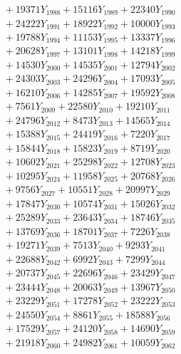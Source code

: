 \documentclass[a4paper,10pt]{article}
\begin{document}
{\begin{align}
&\;  + 19371 Y_{1988} + 15116 Y_{1989} + 22340 Y_{1990} \\[0.3ex]
&\;  + 24222 Y_{1991} + 18922 Y_{1992} + 10000 Y_{1993} \\[0.3ex]
&\;  + 19788 Y_{1994} + 11153 Y_{1995} + 13337 Y_{1996} \\[0.3ex]
&\;  + 20628 Y_{1997} + 13101 Y_{1998} + 14218 Y_{1999} \\[0.3ex]
&\;  + 14530 Y_{2000} + 14535 Y_{2001} + 12794 Y_{2002} \\[0.3ex]
&\;  + 24303 Y_{2003} + 24296 Y_{2004} + 17093 Y_{2005} \\[0.3ex]
&\;  + 16210 Y_{2006} + 14285 Y_{2007} + 19592 Y_{2008} \\[0.5ex]\allowbreak
&\;  + 7561 Y_{2009} + 22580 Y_{2010} + 19210 Y_{2011} \\[0.3ex]
&\;  + 24796 Y_{2012} + 8473 Y_{2013} + 14565 Y_{2014} \\[0.3ex]
&\;  + 15388 Y_{2015} + 24419 Y_{2016} + 7220 Y_{2017} \\[0.3ex]
&\;  + 15844 Y_{2018} + 15823 Y_{2019} + 8719 Y_{2020} \\[0.3ex]
&\;  + 10602 Y_{2021} + 25298 Y_{2022} + 12708 Y_{2023} \\[0.3ex]
&\;  + 10295 Y_{2024} + 11958 Y_{2025} + 20768 Y_{2026} \\[0.3ex]
&\;  + 9756 Y_{2027} + 10551 Y_{2028} + 20997 Y_{2029} \\[0.3ex]
&\;  + 17847 Y_{2030} + 10574 Y_{2031} + 15026 Y_{2032} \\[0.3ex]
&\;  + 25289 Y_{2033} + 23643 Y_{2034} + 18746 Y_{2035} \\[0.3ex]
&\;  + 13769 Y_{2036} + 18701 Y_{2037} + 7226 Y_{2038} \\[0.5ex]\allowbreak
&\;  + 19271 Y_{2039} + 7513 Y_{2040} + 9293 Y_{2041} \\[0.3ex]
&\;  + 22688 Y_{2042} + 6992 Y_{2043} + 7299 Y_{2044} \\[0.3ex]
&\;  + 20737 Y_{2045} + 22696 Y_{2046} + 23429 Y_{2047} \\[0.3ex]
&\;  + 23444 Y_{2048} + 20063 Y_{2049} + 13967 Y_{2050} \\[0.3ex]
&\;  + 23229 Y_{2051} + 17278 Y_{2052} + 23222 Y_{2053} \\[0.3ex]
&\;  + 24550 Y_{2054} + 8861 Y_{2055} + 18588 Y_{2056} \\[0.3ex]
&\;  + 17529 Y_{2057} + 24120 Y_{2058} + 14690 Y_{2059} \\[0.3ex]
&\;  + 21918 Y_{2060} + 24982 Y_{2061} + 10059 Y_{2062} \\[0.3ex]

\end{align}}
\end{document}
